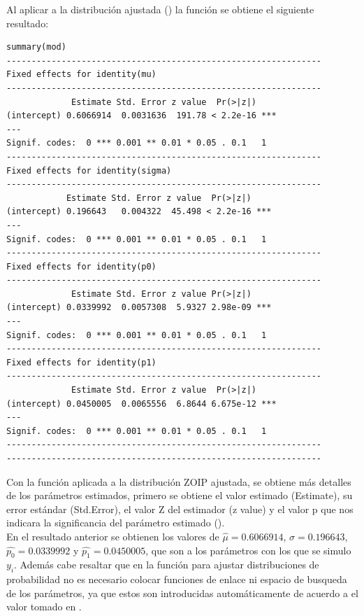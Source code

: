  Al aplicar a la distribuci\'{o}n ajustada () la funci\'{o}n  se obtiene el siguiente resultado:

\begin{verbatim}
summary(mod)
---------------------------------------------------------------
Fixed effects for identity(mu)
---------------------------------------------------------------
             Estimate Std. Error z value  Pr(>|z|)    
(intercept) 0.6066914  0.0031636  191.78 < 2.2e-16 ***
---
Signif. codes:  0 *** 0.001 ** 0.01 * 0.05 . 0.1   1
---------------------------------------------------------------
Fixed effects for identity(sigma)
---------------------------------------------------------------
            Estimate Std. Error z value  Pr(>|z|)    
(intercept) 0.196643   0.004322  45.498 < 2.2e-16 ***
---
Signif. codes:  0 *** 0.001 ** 0.01 * 0.05 . 0.1   1
---------------------------------------------------------------
Fixed effects for identity(p0)
---------------------------------------------------------------
             Estimate Std. Error z value Pr(>|z|)    
(intercept) 0.0339992  0.0057308  5.9327 2.98e-09 ***
---
Signif. codes:  0 *** 0.001 ** 0.01 * 0.05 . 0.1   1
---------------------------------------------------------------
Fixed effects for identity(p1)
---------------------------------------------------------------
             Estimate Std. Error z value  Pr(>|z|)    
(intercept) 0.0450005  0.0065556  6.8644 6.675e-12 ***
---
Signif. codes:  0 *** 0.001 ** 0.01 * 0.05 . 0.1   1
---------------------------------------------------------------
---------------------------------------------------------------
\end{verbatim}
Con la funci\'{o}n  aplicada a la distribuci\'{o}n ZOIP ajustada, se obtiene m\'{a}s detalles de los par\'{a}metros estimados, primero se obtiene el valor estimado (Estimate), su error est\'{a}ndar (Std.Error), el valor Z del estimador (z value) y el valor p que nos indicara la significancia del par\'{a}metro estimado ().\\

En el resultado anterior se obtienen los valores de $\hat{\mu}=0.6066914$, $\hat{\sigma}=0.196643$, $\hat{p_0}=0.0339992$ y $\hat{p_1}=0.0450005$, que son a los par\'{a}metros con los que se simulo $y_i$. Adem\'{a}s cabe resaltar que en la funci\'{o}n  para ajustar distribuciones de probabilidad no es necesario colocar funciones de enlace ni espacio de busqueda de los par\'{a}metros, ya que estos son introducidas autom\'{a}ticamente de acuerdo a el valor tomado en .


